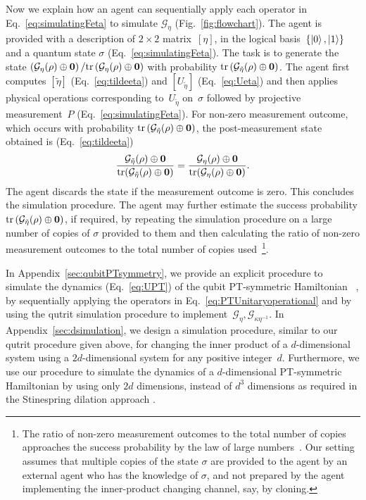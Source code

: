 \documentclass[amsmath,amssymb,aps,pra,superscriptaddress,twocolumn]{revtex4-2}
\begin{document}
Now we explain how an agent 
can sequentially apply each operator in Eq.~\eqref{eq:simulatingFeta}
to simulate $\mathcal{G}_{\eta}$ (Fig.~\ref{fig:flowchart}).
The agent is provided with a description of $2\times2$ matrix~$[\eta]$,
in the logical basis~$\{\ket0,\ket1\}$ 
and a quantum state $\sigma$ (Eq.~\eqref{eq:simulatingFeta}).
The task is to generate the state
$\left({\mathcal{G}_{\eta}(\rho)\oplus \bm{0}}\right)/{{\rm tr}\left(\mathcal{G}_{\eta}(\rho)\oplus \bm{0}\right)}$
with probability ${\rm tr}\left(\mathcal{G}_{\tilde{\eta}}(\rho)\oplus \bm{0}\right)$.
The agent first computes $\left[\tilde{\eta}\right]$ (Eq.~\eqref{eq:tildeeta}) and
$\left[U_{\tilde{\eta}}\right]$ (Eq.~\eqref{eq:Ueta})
and then applies physical operations corresponding to~$U_{\tilde{\eta}}$ on~$\sigma$ followed by projective measurement~$P$ (Eq.~\eqref{eq:simulatingFeta}).
For non-zero measurement outcome,
which occurs with probability ${\rm tr}\left(\mathcal{G}_{\tilde{\eta}}(\rho)\oplus \bm{0}\right)$,
the post-measurement state obtained is
(Eq.~\eqref{eq:tildeeta})
\begin{equation}
   \frac{\mathcal{G}_{\tilde{\eta}}(\rho)\oplus \bm{0}}{{\rm tr}(\mathcal{G}_{\tilde{\eta}}(\rho)\oplus \bm{0})} = \frac{\mathcal{G}_\eta(\rho)\oplus \bm{0}}{{\rm tr}(\mathcal{G}_\eta(\rho)\oplus \bm{0})}.
\end{equation}
The agent discards the state if the measurement outcome is zero.
This concludes the simulation procedure.
The agent may further estimate the success probability ${\rm tr}\left(\mathcal{G}_{\tilde{\eta}}(\rho)\oplus \bm{0}\right)$,
if required, by repeating the simulation procedure on a large number of copies
of $\sigma$ provided to them and then calculating the ratio of non-zero measurement outcomes to the total
number of copies used~\footnote{
The ratio of non-zero measurement outcomes to the total
number of copies approaches the success probability by the law of large numbers~\cite{DKLM05}.
Our setting assumes that multiple copies of the state $\sigma$
are provided to the agent by an external agent who has the knowledge of
$\sigma$, and not prepared by the agent implementing the inner-product changing channel, say, by cloning.}.


In Appendix~\ref{sec:qubitPTsymmetry}, we provide an explicit 
procedure to simulate the dynamics (Eq.~\eqref{eq:UPT}) 
of the qubit PT-symmetric Hamiltonian 
~\cite{BB98},
by sequentially applying the operators in Eq.~\eqref{eq:PTUnitaryoperational} and by using the qutrit 
simulation procedure to implement~$\mathcal{G}_{\eta},\mathcal{G}_{\kappa\eta^{-1}}$.
In Appendix~\ref{sec:dsimulation}, we design a simulation procedure, similar to our qutrit procedure given above, 
for changing the inner product of a $d$-dimensional 
system using a $2d$-dimensional system for any positive integer~$d$. Furthermore, we
use our procedure to simulate the dynamics of a $d$-dimensional PT-symmetric Hamiltonian
by using only $2d$ dimensions, instead of $d^3$ dimensions as required in the Stinespring dilation approach \cite{Sti95}.
\end{document}
